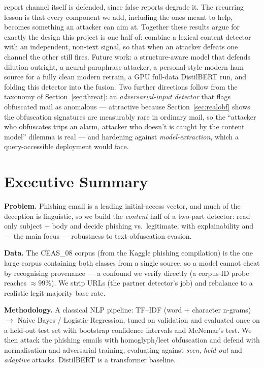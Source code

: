 \documentclass[11pt]{article}
\begin{document}
report channel itself is defended, since false reports degrade it. The recurring lesson is that every
component we add, including the ones meant to help, becomes something an attacker can aim at.
Together these results argue for exactly the design this project is one half of:
combine a lexical content detector with an independent, non-text signal, so that
when an attacker defeats one channel the other still fires. Future work: a structure-aware model that
defends dilution outright, a neural-paraphrase attacker, a personal-style modern ham source for a
fully clean modern retrain, a GPU full-data DistilBERT run, and folding this detector into the fusion.
Two further directions follow from the taxonomy of Section~\ref{sec:threat}: an
\emph{adversarial-input detector} that flags obfuscated mail as anomalous --- attractive
because Section~\ref{sec:realobf} shows the obfuscation signatures are measurably rare in
ordinary mail, so the ``attacker who obfuscates trips an alarm, attacker who doesn't is
caught by the content model'' dilemma is real --- and hardening against
\emph{model-extraction}, which a query-accessible deployment would face.

\section{Executive Summary}
\textbf{Problem.} Phishing email is a leading initial-access vector, and much of the
deception is linguistic, so we build the \emph{content} half of a two-part detector:
read only subject + body and decide phishing vs.\ legitimate, with explainability and
--- the main focus --- robustness to text-obfuscation evasion.

\textbf{Data.} The CEAS\_08 corpus (from the Kaggle phishing compilation) is the one
large corpus containing both classes from a single source, so a model cannot cheat by
recognising provenance --- a confound we verify directly (a corpus-ID probe reaches
$\approx99\%$). We strip URLs (the partner detector's job) and rebalance to a realistic
legit-majority base rate.

\textbf{Methodology.} A classical NLP pipeline: TF--IDF (word + character n-grams)
$\rightarrow$ Naive Bayes / Logistic Regression, tuned on validation and evaluated once
on a held-out test set with bootstrap confidence intervals and McNemar's test. We then
attack the phishing emails with homoglyph/leet obfuscation and defend with
normalisation and adversarial training, evaluating against \emph{seen}, \emph{held-out}
and \emph{adaptive} attacks. DistilBERT is a transformer baseline.
\end{document}

